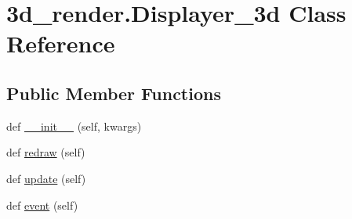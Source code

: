 \hypertarget{class3d__render_1_1_displayer__3d}{}\section{3d\+\_\+render.Displayer\+\_\+3d Class Reference}
\label{class3d__render_1_1_displayer__3d}
\subsection*{Public Member Functions}
\begin{DoxyCompactItemize}
\item 
def \hyperlink{class3d__render_1_1_displayer__3d_ae40788b69bb8bba58cebe721b42107fa}{\+\_\+\+\_\+init\+\_\+\+\_\+} (self, kwargs)
\item 
def \hyperlink{class3d__render_1_1_displayer__3d_a0c6e1eda01ff75b2615f514ac5a8bafd}{redraw} (self)
\item 
def \hyperlink{class3d__render_1_1_displayer__3d_a8c821c26e03e20daf04b60ff06779afd}{update} (self)
\item 
def \hyperlink{class3d__render_1_1_displayer__3d_a1a1e078e2d6fede0b4489bc8f141e788}{event} (self)
\end{DoxyCompactItemize}
